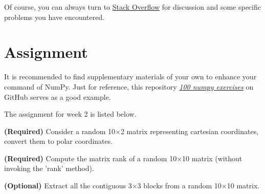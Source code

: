 \documentclass[english]{../TeXTemplate/pkupaper}
\begin{document}
Of course, you can always turn to \href{https://stackoverflow.com/}{Stack Overflow} for discussion and some specific problems you have encountered.

\section{Assignment}

It is recommended to find supplementary materials of your own to enhance your command of NumPy. Just for reference, this repository \href{https://github.com/rougier/numpy-100}{\emph{100 numpy exercises}} on GitHub serves as a good example.

The assignment for week 2 is listed below.

\begin{partlist}
\item \textbf{(Required)} Consider a random 10$\times $2 matrix representing cartesian coordinates, convert them to polar coordinates.
\item \textbf{(Required)} Compute the matrix rank of a random 10$\times $10 matrix (without invoking the 'rank' method).
\item \textbf{(Optional)} Extract all the contiguous 3$\times $3 blocks from a random 10$\times $10 matrix.
\end{partlist}
\end{document}
